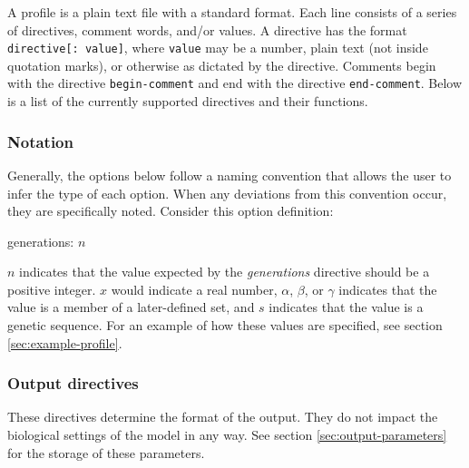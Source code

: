 \documentclass{article}
\begin{document}
      A profile is a plain text file with a standard format. Each line consists
      of a series of directives, comment words, and/or values. A directive has
      the format \verb|directive[: value]|, where \verb|value| may be a number,
      plain text (not inside quotation marks), or otherwise as dictated by the
      directive. Comments begin with the directive \verb|begin-comment| and end
      with the directive \verb|end-comment|. Below is a list of the currently
      supported directives and their functions.

      \subsubsection{Notation}
        \label{sec:notation}

        Generally, the options below follow a naming convention that allows the
        user to infer the type of each option. When any deviations from this
        convention occur, they are specifically noted. Consider this option
        definition:

        \begin{center}
          generations: $n$
        \end{center}

        \noindent $n$ indicates that the value expected by the {\em generations}
        directive should be a positive integer. $x$ would indicate a real
        number, $\alpha$, $\beta$, or $\gamma$ indicates that the value is a
        member of a later-defined set, and $s$ indicates that the value is a
        genetic sequence. For an example of how these values are specified, see
        section \ref{sec:example-profile}.

      \subsubsection{Output directives}
        \label{sec:output-directives}

        These directives determine the format of the output. They do not impact
        the biological settings of the model in any way. See section
	\ref{sec:output-parameters} for the storage of these parameters.
\end{document}
